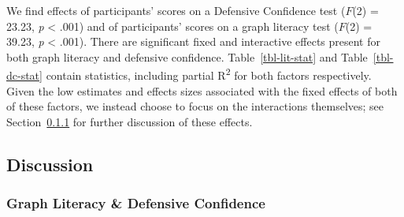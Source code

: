\documentclass[manuscript,screen,review]{acmart}
\begin{document}
\begin{table}

\caption{\label{tbl-dc-stat}Statistics for main effects and interactions
when scores on the Defensive Confidence test are included in the model.}


\end{table}%

We find effects of participants' scores on a Defensive Confidence test
(\(F\)(2) = 23.23, \emph{p} \textless{} .001) and of participants'
scores on a graph literacy test \citep{garcia_2016} (\(F\)(2) = 39.23,
\emph{p} \textless{} .001). There are significant fixed and interactive
effects present for both graph literacy and defensive confidence.
Table~\ref{tbl-lit-stat} and Table~\ref{tbl-dc-stat} contain statistics,
including partial R\textsuperscript{2} for both factors respectively.
Given the low estimates and effects sizes associated with the fixed
effects of both of these factors, we instead choose to focus on the
interactions themselves; see Section~\ref{sec-add-analyses} for further
discussion of these effects.

\subsection{Discussion}\label{discussion}

\subsubsection{Graph Literacy \& Defensive
Confidence}\label{sec-add-analyses}
\end{document}
